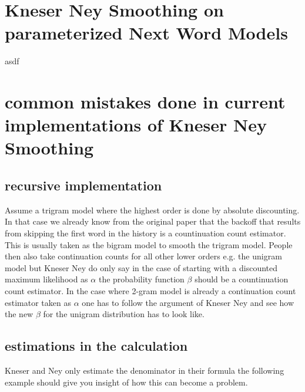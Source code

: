 \begin{appendix}
\section{Kneser Ney Smoothing on parameterized Next Word Models}
 asdf

\section{common mistakes done in current implementations of Kneser Ney Smoothing}
\subsection{recursive implementation}
Assume a trigram model where the highest order is done by absolute discounting. 
In that case we already know from the original paper that the backoff that results from skipping the first word in the history is a countinuation count estimator.
This is usually taken as the bigram model to smooth the trigram model.
People then also take continuation counts for all other lower orders e.g. the unigram model but Kneser Ney do only say in the case of starting with a discounted maximum likelihood as $\alpha$ the probability function $\beta$ should be a countinuation count estimator.
In the case where 2-gram model is already a continuation count estimator taken as $\alpha$ one has to follow the argument of Kneser Ney and see how the new $\beta$ for the unigram distribution has to look like.
\subsection{estimations in the calculation}
Kneser and Ney only estimate the denominator in their formula the following example should give you insight of how this can become a problem. 

\end{appendix}
